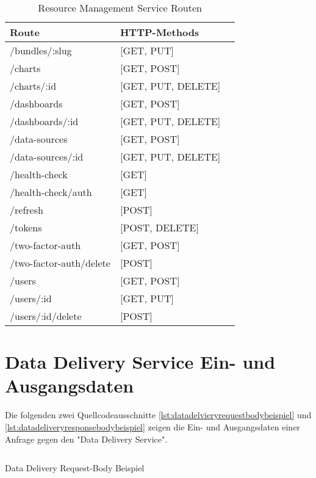 \begin{table}[h]
\begin{center}
\begin{tabular}{llc}
Route & HTTP-Methods \\
\hline
/bundles/:slug          & [GET, PUT]         \\
/charts                 & [GET, POST]        \\
/charts/:id             & [GET, PUT, DELETE] \\
/dashboards             & [GET, POST]        \\
/dashboards/:id         & [GET, PUT, DELETE] \\
/data-sources           & [GET, POST]        \\
/data-sources/:id       & [GET, PUT, DELETE] \\
/health-check           & [GET]              \\
/health-check/auth      & [GET]              \\
/refresh                & [POST]             \\
/tokens                 & [POST, DELETE]     \\
/two-factor-auth        & [GET, POST]        \\
/two-factor-auth/delete & [POST]             \\
/users                  & [GET, POST]        \\
/users/:id              & [GET, PUT]         \\
/users/:id/delete       & [POST]             \\
\end{tabular}
\end{center}
\caption{Resource Management Service Routen}
\label{tab:resourcemanagementservicerouten}
\end{table}

\newpage

\section*{Data Delivery Service Ein- und Ausgangsdaten}
\label{sec:datadeliveryserviceeinundausgangsdaten}

Die folgenden zwei Quellcodeausschnitte \ref{lst:datadelvieryrequestbodybeispiel}
und \ref{lst:datadeliveryresponsebodybeispiel} zeigen die Ein- und
Ausgangsdaten einer Anfrage gegen den "Data Delivery Service".

\begin{listing}[h]
    \inputminted{jsx}{snippets/json/data-delivery-example/request.data-delivery.txt}
    \caption{Data Delivery Request-Body Beispiel}
    \label{lst:datadelvieryrequestbodybeispiel}
\end{listing}

